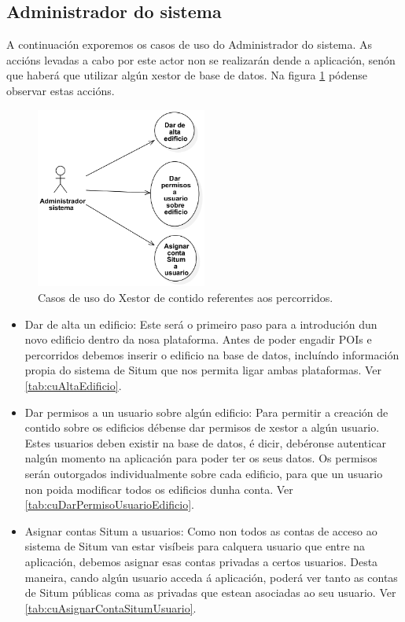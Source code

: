 \subsection{Administrador do sistema}
A continuación exporemos os casos de uso do Administrador do sistema. As accións levadas a cabo por este actor non se realizarán dende a aplicación, senón que haberá que utilizar algún xestor de base de datos. Na figura \ref{fig:cuAdministradorSistema} pódense observar estas accións.

\begin{figure}[tbh]
	\begin{center}
		\includegraphics[width=0.5\textwidth]{figures/CasosUso/AdministradorSistema}
		\caption{Casos de uso do Xestor de contido referentes aos percorridos.}
		\label{fig:cuAdministradorSistema}
	\end{center}
\end{figure}

\begin{itemize}
	\item Dar de alta un edificio: Este será o primeiro paso para a introdución dun novo edificio dentro da nosa plataforma. Antes de poder engadir POIs e percorridos debemos inserir o edificio na base de datos, incluíndo información propia do sistema de Situm que nos permita ligar ambas plataformas. Ver \ref{tab:cuAltaEdificio}.
	\item Dar permisos a un usuario sobre algún edificio: Para permitir a creación de contido sobre os edificios débense dar permisos de xestor a algún usuario. Estes usuarios deben existir na base de datos, é dicir, debéronse autenticar nalgún momento na aplicación para poder ter os seus datos. Os permisos serán outorgados individualmente sobre cada edificio, para que un usuario non poida modificar todos os edificios dunha conta. Ver \ref{tab:cuDarPermisoUsuarioEdificio}.
	\item Asignar contas Situm a usuarios: Como non todos as contas de acceso ao sistema de Situm van estar visíbeis para calquera usuario que entre na aplicación, debemos asignar esas contas privadas a certos usuarios. Desta maneira, cando algún usuario acceda á aplicación, poderá ver tanto as contas de Situm públicas coma as privadas que estean asociadas ao seu usuario. Ver \ref{tab:cuAsignarContaSitumUsuario}.
\end{itemize}